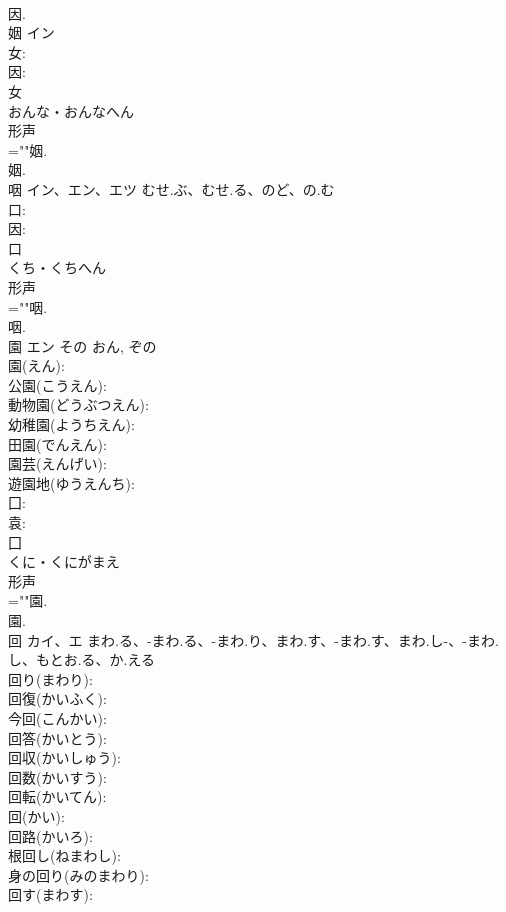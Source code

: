 \documentclass[8pt]{extreport}
\begin{document}
\begin{CJK}{UTF8}{min}
\\	因.
\\	姻	イン			
\\	女: 
\\	因: 
\\	女	
\\	おんな・おんなへん	
\\	形声 
\\	=""姻.
\\	姻.
\\	咽	イン、エン、エツ	むせ.ぶ、むせ.る、のど、の.む		
\\	口: 
\\	因: 
\\	口	
\\	くち・くちへん	
\\	形声 
\\	=""咽.
\\	咽.
\\	園	エン	その	おん, ぞの	
\\	園(えん): 
\\	公園(こうえん): 
\\	動物園(どうぶつえん): 
\\	幼稚園(ようちえん): 
\\	田園(でんえん): 
\\	園芸(えんげい): 
\\	遊園地(ゆうえんち): 
\\	囗: 
\\	袁: 
\\	囗	
\\	くに・くにがまえ	
\\	形声 
\\	=""園.
\\	園.
\\	回	カイ、エ	まわ.る、-まわ.る、-まわ.り、まわ.す、-まわ.す、まわ.し-、-まわ.し、もとお.る、か.える		
\\	回り(まわり): 
\\	回復(かいふく): 
\\	今回(こんかい): 
\\	回答(かいとう): 
\\	回収(かいしゅう): 
\\	回数(かいすう): 
\\	回転(かいてん): 
\\	回(かい): 
\\	回路(かいろ): 
\\	根回し(ねまわし): 
\\	身の回り(みのまわり): 
\\	回す(まわす): 

\end{CJK}
\end{document}
